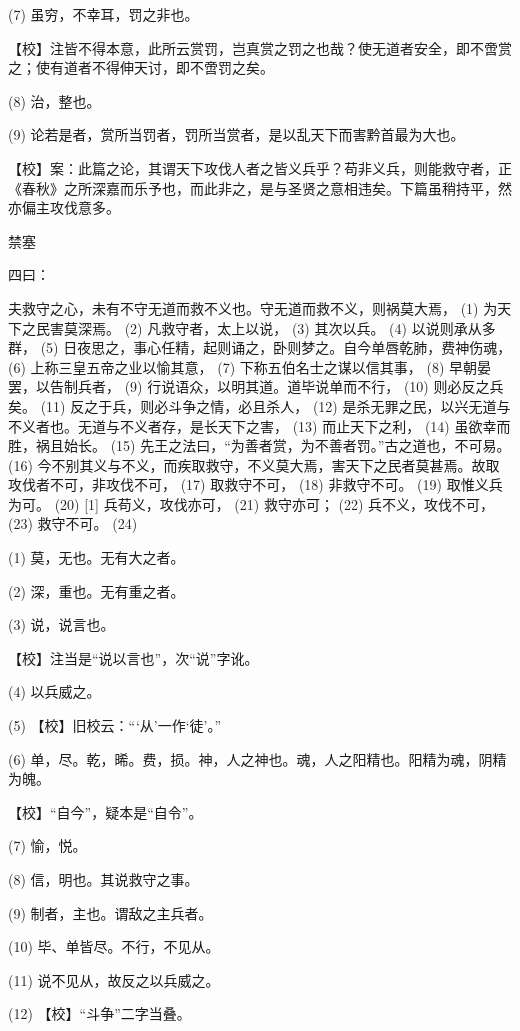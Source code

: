 \documentclass[12pt,UTF8]{ctexbook}
\begin{document}
(7) 虽穷，不幸耳，罚之非也。

【校】注皆不得本意，此所云赏罚，岂真赏之罚之也哉？使无道者安全，即不啻赏之；使有道者不得伸天讨，即不啻罚之矣。

(8) 治，整也。

(9) 论若是者，赏所当罚者，罚所当赏者，是以乱天下而害黔首最为大也。

【校】案：此篇之论，其谓天下攻伐人者之皆义兵乎？苟非义兵，则能救守者，正《春秋》之所深嘉而乐予也，而此非之，是与圣贤之意相违矣。下篇虽稍持平，然亦偏主攻伐意多。





禁塞


四曰：

夫救守之心，未有不守无道而救不义也。守无道而救不义，则祸莫大焉， (1) 为天下之民害莫深焉。 (2) 凡救守者，太上以说， (3) 其次以兵。 (4) 以说则承从多群， (5) 日夜思之，事心任精，起则诵之，卧则梦之。自今单唇乾肺，费神伤魂， (6) 上称三皇五帝之业以愉其意， (7) 下称五伯名士之谋以信其事， (8) 早朝晏罢，以告制兵者， (9) 行说语众，以明其道。道毕说单而不行， (10) 则必反之兵矣。 (11) 反之于兵，则必斗争之情，必且杀人， (12) 是杀无罪之民，以兴无道与不义者也。无道与不义者存，是长天下之害， (13) 而止天下之利， (14) 虽欲幸而胜，祸且始长。 (15) 先王之法曰，“为善者赏，为不善者罚。”古之道也，不可易。 (16) 今不别其义与不义，而疾取救守，不义莫大焉，害天下之民者莫甚焉。故取攻伐者不可，非攻伐不可， (17) 取救守不可， (18) 非救守不可。 (19) 取惟义兵为可。 (20) [1] 兵苟义，攻伐亦可， (21) 救守亦可； (22) 兵不义，攻伐不可， (23) 救守不可。 (24)

(1) 莫，无也。无有大之者。

(2) 深，重也。无有重之者。

(3) 说，说言也。

【校】注当是“说以言也”，次“说”字讹。

(4) 以兵威之。

(5) 【校】旧校云：“‘从’一作‘徒’。”

(6) 单，尽。乾，晞。费，损。神，人之神也。魂，人之阳精也。阳精为魂，阴精为魄。

【校】“自今”，疑本是“自令”。

(7) 愉，悦。

(8) 信，明也。其说救守之事。

(9) 制者，主也。谓敌之主兵者。

(10) 毕、单皆尽。不行，不见从。

(11) 说不见从，故反之以兵威之。

(12) 【校】“斗争”二字当叠。
\end{document}
